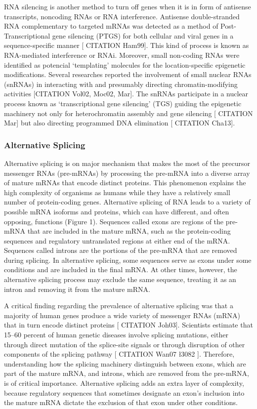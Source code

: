 RNA silencing is another method to turn off genes when it is in form of antisense transcripts, noncoding RNAs or RNA interference. Antisense double-stranded RNA complementary to targeted mRNAs was detected as a method of Post-Transcriptional gene silencing (PTGS) for both cellular and viral genes in a sequence-specific manner [ CITATION Ham99]. This kind of process is known as RNA-mediated interference or RNAi. Moreover, small non-coding RNAs were identified as potencial ‘templating’ molecules for the location-specific epigenetic modifications. Several researches reported the involvement of small nuclear RNAs (snRNAs) in interacting with and presumably directing chromatin-modifying activities [CITATION Vol02, Moc02, Mar]. The snRNAs participate in a nuclear process known as ‘transcriptional gene silencing’ (TGS) guiding the epigenetic machinery not only for heterochromatin assembly and gene silencing [ CITATION Mar] but also directing programmed DNA elimination [ CITATION Cha13].

\subsubsection{Alternative Splicing}

Alternative splicing is on major mechanism that makes the most of the precursor messenger RNAs (pre-mRNAs) by processing the pre-mRNA into a diverse array of mature mRNAs that encode distinct proteins. This phenomenon explains the high complexity of organisms as humans while they have a relatively small number of protein-coding genes. Alternative splicing of RNA leads to a variety of possible mRNA isoforms and proteins, which can have different, and often opposing, functions (Figure 1). Sequences called exons are regions of the pre-mRNA that are included in the mature mRNA, such as the protein-coding sequences and regulatory untranslated regions at either end of the mRNA. Sequences called introns are the portions of the pre-mRNA that are removed during splicing. In alternative splicing, some sequences serve as exons under some conditions and are included in the final mRNA. At other times, however, the alternative splicing process may exclude the same sequence, treating it as an intron and removing it from the mature mRNA.

\medskip

A critical finding regarding the prevalence of alternative splicing was that a majority of human genes produce a wide variety of messenger RNAs (mRNA) that in turn encode distinct proteins [ CITATION Joh03]. Scientists estimate that 15–60 percent of human genetic diseases involve splicing mutations, either through direct mutation of the splice-site signals or through disruption of other components of the splicing pathway [ CITATION Wan07 \l 3082 ]. Therefore, understanding how the splicing machinery distinguish between exons, which are part of the mature mRNA, and introns, which are removed from the pre-mRNA, is of critical importance. Alternative splicing adds an extra layer of complexity, because regulatory sequences that sometimes designate an exon's inclusion into the mature mRNA dictate the exclusion of that exon under other conditions.


